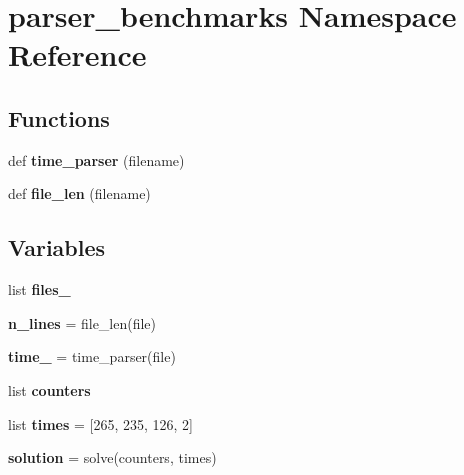 \hypertarget{namespaceparser__benchmarks}{}\section{parser\+\_\+benchmarks Namespace Reference}
\label{namespaceparser__benchmarks}
\subsection*{Functions}
\begin{DoxyCompactItemize}
\item 
def {\bfseries time\+\_\+parser} (filename)\hypertarget{namespaceparser__benchmarks_a00b85a8cd3109dfa27b9694b5be1d61f}{}\label{namespaceparser__benchmarks_a00b85a8cd3109dfa27b9694b5be1d61f}

\item 
def {\bfseries file\+\_\+len} (filename)\hypertarget{namespaceparser__benchmarks_ae845829732c5dacef0ffe6833d5fe511}{}\label{namespaceparser__benchmarks_ae845829732c5dacef0ffe6833d5fe511}

\end{DoxyCompactItemize}
\subsection*{Variables}
\begin{DoxyCompactItemize}
\item 
list {\bfseries files\+\_\+}
\item 
{\bfseries n\+\_\+lines} = file\+\_\+len(file)\hypertarget{namespaceparser__benchmarks_a9b821d945bd7eddbad4535f6f6d08637}{}\label{namespaceparser__benchmarks_a9b821d945bd7eddbad4535f6f6d08637}

\item 
{\bfseries time\+\_\+} = time\+\_\+parser(file)\hypertarget{namespaceparser__benchmarks_afc7df3a678d04c92491a366c6fe40283}{}\label{namespaceparser__benchmarks_afc7df3a678d04c92491a366c6fe40283}

\item 
list {\bfseries counters}
\item 
list {\bfseries times} = \mbox{[}265, 235, 126, 2\mbox{]}\hypertarget{namespaceparser__benchmarks_a704dcbdf1e924af058a7ac9d0604a1ec}{}\label{namespaceparser__benchmarks_a704dcbdf1e924af058a7ac9d0604a1ec}

\item 
{\bfseries solution} = solve(counters, times)\hypertarget{namespaceparser__benchmarks_a5667d72a691380f11e58f7686cea6a71}{}\label{namespaceparser__benchmarks_a5667d72a691380f11e58f7686cea6a71}

\end{DoxyCompactItemize}



